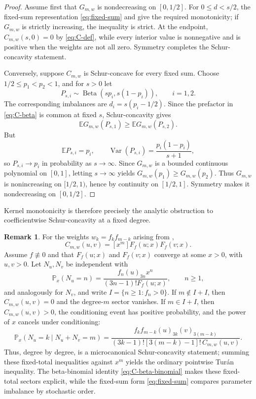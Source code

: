 \documentclass[11pt,a4paper]{amsart}
\numberwithin{equation}{section}
\theoremstyle{plain}
\theoremstyle{definition}
\newtheorem{remark}[theorem]{Remark}
\newcommand{\E}{\mathbb E}
\newcommand{\Pp}{\mathbb P}
\begin{document}
\begin{proof}
Assume first that \(G_{m,w}\) is nondecreasing on \([0,1/2]\).  For
\(0\le d<s/2\), the fixed-sum representation \eqref{eq:fixed-sum} and  give the required monotonicity; if \(G_{m,w}\) is strictly
increasing, the inequality is strict.  At the endpoint, \(C_{m,w}(s,0)=0\)
by \eqref{eq:C-def}, while every interior value is nonnegative and is positive
when the weights are not all zero.  Symmetry completes the Schur-concavity
statement.

Conversely, suppose \(C_{m,w}\) is Schur-concave for every fixed sum.  Choose
\(1/2\le p_1<p_2<1\), and for \(s>0\) let
\[
 P_{s,i}\sim\operatorname{Beta}(sp_i,s(1-p_i)),
 \qquad i=1,2.
\]
The corresponding imbalances are \(d_i=s(p_i-1/2)\).  Since the prefactor in
\eqref{eq:C-beta} is common at fixed \(s\), Schur-concavity gives
\[
 \E G_{m,w}(P_{s,1})\ge \E G_{m,w}(P_{s,2}).
\]
But
\[
 \E P_{s,i}=p_i,\qquad
 \operatorname{Var}(P_{s,i})=\frac{p_i(1-p_i)}{s+1},
\]
so \(P_{s,i}\to p_i\) in probability as \(s\to\infty\).  Since \(G_{m,w}\) is a
bounded continuous polynomial on \([0,1]\), letting \(s\to\infty\) yields
\(G_{m,w}(p_1)\ge G_{m,w}(p_2)\).  Thus \(G_{m,w}\) is nonincreasing on
\([1/2,1)\), hence by continuity on \([1/2,1]\).  Symmetry makes it
nondecreasing on \([0,1/2]\).
\end{proof}

Kernel monotonicity is therefore precisely the analytic obstruction to
coefficientwise Schur-concavity at a fixed degree.

\begin{remark}\label{rem:fixed-total}
For the weights \(w_k=f_kf_{m-k}\) arising from ,
\[
 C_{m,w}(u,v)=[x^m]F_f(u;x)F_f(v;x).
\]
Assume \(f\not\equiv0\) and that \(F_f(u;x)\) and \(F_f(v;x)\) converge at
some \(x>0\), with \(u,v>0\).  Let \(N_u,N_v\) be independent with
\[
 \Pp_x(N_u=n)
 =\frac{f_n(u)_{3n}x^n}{(3n-1)!F_f(u;x)},
 \qquad n\ge1,
\]
and analogously for \(N_v\), and write \(I=\{n\ge1:f_n>0\}\).  If
\(m\notin I+I\), then \(C_{m,w}(u,v)=0\) and the degree-\(m\) sector
vanishes.  If \(m\in I+I\), then \(C_{m,w}(u,v)>0\), the conditioning event
has positive probability, and the power of \(x\) cancels under conditioning:
\[
 \Pp_x(N_u=k\mid N_u+N_v=m)
 =\frac{f_kf_{m-k}(u)_{3k}(v)_{3(m-k)}}
 {(3k-1)![3(m-k)-1]!\,C_{m,w}(u,v)}.
\]
Thus, degree by degree,  is a microcanonical Schur-concavity
statement; summing these fixed-total inequalities against \(x^m\) yields the
ordinary pointwise Tur\'an inequality.  The beta-binomial identity
\eqref{eq:C-beta-binomial} makes these fixed-total sectors explicit, while the
fixed-sum form \eqref{eq:fixed-sum} compares parameter imbalance by stochastic
order.
\end{remark}
\end{document}
